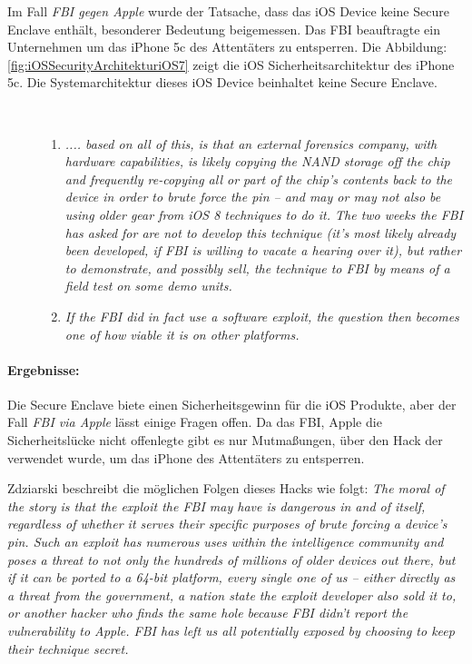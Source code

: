  Im Fall \textit{\glqq FBI gegen Apple\grqq{}} wurde der Tatsache, dass das iOS Device keine Secure Enclave enthält, besonderer Bedeutung beigemessen. Das FBI beauftragte ein Unternehmen um das iPhone 5c des Attentäters zu entsperren. Die Abbildung: \ref{fig:iOSSecurityArchitekturiOS7} zeigt die iOS Sicherheitsarchitektur des iPhone 5c. Die Systemarchitektur dieses iOS Device beinhaltet keine Secure Enclave. \par 
\begin{description}
    \item[\parbox{\textwidth} { Der Sicherheitsforscher Zdziarski beschreibt in seinen Abhandlungen die plausiblen Varianten des FBI Hacks wie folgt}]~\par
    \begin{enumerate}
        \item \textit{\glqq .... based on all of this, is that an external forensics company, with hardware capabilities, is likely copying the NAND storage off the chip and frequently re-copying all or part of the chip’s contents back to the device in order to brute force the pin – and may or may not also be using older gear from iOS 8 techniques to do it. The two weeks the FBI has asked for are not to develop this technique (it’s most likely already been developed, if FBI is willing to vacate a hearing over it), but rather to demonstrate, and possibly sell, the technique to FBI by means of a field test on some demo units.\grqq{}} \cite{Hacking[4]}
        \item \textit{\glqq If the FBI did in fact use a software exploit, the question then becomes one of how viable it is on other platforms.\grqq{}} \cite{Hacking[4]}
    \end{enumerate}
\end{description} 

\paragraph{Ergebnisse:} Die Secure Enclave biete einen Sicherheitsgewinn für die iOS Produkte, aber der Fall \textit{\glqq FBI via Apple\grqq{}} lässt einige Fragen offen. Da das FBI, Apple die Sicherheitslücke nicht offenlegte gibt es nur Mutmaßungen, über den Hack der verwendet wurde, um das iPhone des Attentäters zu entsperren. \par 

Zdziarski beschreibt die möglichen Folgen dieses Hacks wie folgt: \textit{\glqq The moral of the story is that the exploit the FBI may have is dangerous in and of itself, regardless of whether it serves their specific purposes of brute forcing a device’s pin. Such an exploit has numerous uses within the intelligence community and poses a threat to not only the hundreds of millions of older devices out there, but if it can be ported to a 64-bit platform, every single one of us – either directly as a threat from the government, a nation state the exploit developer also sold it to, or another hacker who finds the same hole because FBI didn’t report the vulnerability to Apple. FBI has left us all potentially exposed by choosing to keep their technique secret.\grqq{}} \cite{Hacking[4]} \par 

